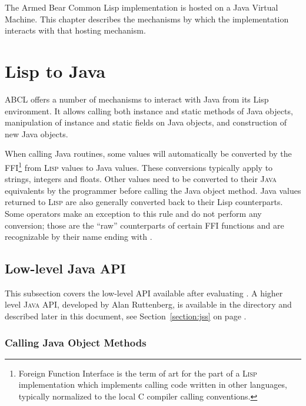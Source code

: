 \documentclass[10pt]{book}
\begin{document}
%

The Armed Bear Common Lisp implementation is hosted on a Java Virtual
Machine.  This chapter describes the mechanisms by which the
implementation interacts with that hosting mechanism.

\section{Lisp to Java}
\label{sec:lisp-java}

\textsc{ABCL} offers a number of mechanisms to interact with Java from its
Lisp environment. It allows calling both instance and static methods
of Java objects, manipulation of instance and static fields on Java
objects, and construction of new Java objects.

When calling Java routines, some values will automatically be
converted by the FFI\footnote{Foreign Function Interface is the term
  of art for the part of a \textsc{Lisp} implementation which implements
  calling code written in other languages, typically normalized to the
  local C compiler calling conventions.}  from \textsc{Lisp} values to Java
values. These conversions typically apply to strings, integers and
floats. Other values need to be converted to their \textsc{Java} equivalents by
the programmer before calling the Java object method. Java values
returned to \textsc{Lisp} are also generally converted back to their Lisp
counterparts. Some operators make an exception to this rule and do not
perform any conversion; those are the ``raw'' counterparts of certain
FFI functions and are recognizable by their name ending with
.

\subsection{Low-level Java API}

This subsection covers the low-level API available after evaluating
.  A higher level \textsc{Java} API, developed by Alan
Ruttenberg, is available in the  directory and described
later in this document, see Section~\ref{section:jss} on page
\pageref{section:jss}.

\subsubsection{Calling Java Object Methods}
\end{document}
